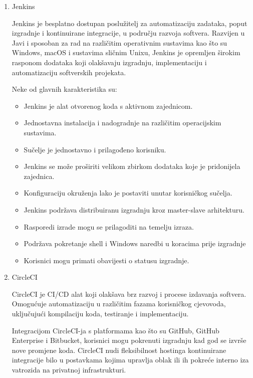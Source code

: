 \documentclass[a4paper,12pt,oneside]{article}
\begin{document}
\begin{enumerate}
\item 
Jenkins

Jenkins je besplatno dostupan poslužitelj za automatizaciju zadataka, poput izgradnje i kontinuirane integracije, u području razvoja softvera. Razvijen u Javi i sposoban za rad na različitim operativnim sustavima kao što su Windows, macOS i sustavima sličnim Unixu, Jenkins je opremljen širokim rasponom dodataka koji olakšavaju izgradnju, implementaciju i automatizaciju softverskih projekata.

Neke od glavnih karakteristika su:
\begin{itemize}
\item Jenkins je alat otvorenog koda s aktivnom zajednicom.
\item Jednostavna instalacija i nadogradnje na različitim operacijskim sustavima.
\item Sučelje je jednostavno i prilagođeno korisniku.
\item Jenkins se može proširiti velikom zbirkom dodataka koje je pridonijela zajednica.
\item Konfiguraciju okruženja lako je postaviti unutar korisničkog sučelja.
\item Jenkins podržava distribuiranu izgradnju kroz master-slave arhitekturu.
\item Rasporedi izrade mogu se prilagoditi na temelju izraza.
\item Podržava pokretanje shell i Windows naredbi u koracima prije izgradnje
\item Korisnici mogu primati obavijesti o statusu izgradnje.
\end{itemize}

\item 
CircleCI 

CircleCI je CI/CD alat koji olakšava brz razvoj i procese izdavanja softvera. Omogućuje automatizaciju u različitim fazama korisničkog cjevovoda, uključujući kompilaciju koda, testiranje i implementaciju.

Integracijom CircleCI-ja s platformama kao što su GitHub, GitHub Enterprise i Bitbucket, korisnici mogu pokrenuti izgradnju kad god se izvrše nove promjene koda. CircleCI nudi fleksibilnost hostinga kontinuirane integracije bilo u postavkama kojima upravlja oblak ili ih pokreće interno iza vatrozida na privatnoj infrastrukturi.


\end{enumerate}
\end{document}
